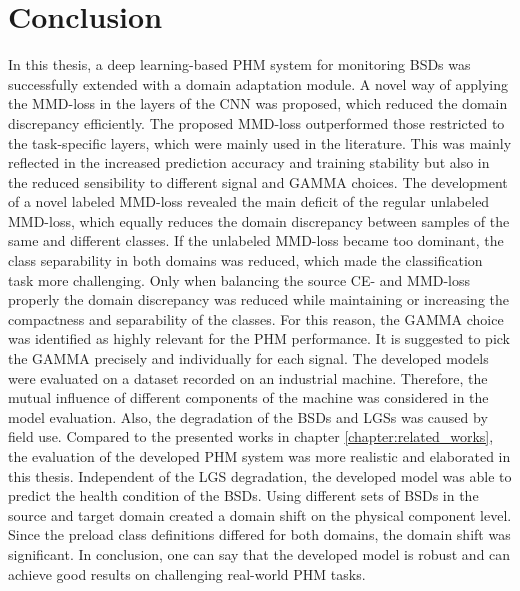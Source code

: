 \chapter{Conclusion}\label{chapter:conclusion}

In this thesis, a deep learning-based PHM system for monitoring BSDs was successfully extended with a domain adaptation module. A novel way of applying the MMD-loss in the layers of the CNN was proposed, which reduced the domain discrepancy efficiently. The proposed MMD-loss outperformed those restricted to the task-specific layers, which were mainly used in the literature. This was mainly reflected in the increased prediction accuracy and training stability but also in the reduced sensibility to different signal and GAMMA choices. The development of a novel labeled MMD-loss revealed the main deficit of the regular unlabeled MMD-loss, which equally reduces the domain discrepancy between samples of the same and different classes. If the unlabeled MMD-loss became too dominant, the class separability in both domains was reduced, which made the classification task more challenging. Only when balancing the source CE- and MMD-loss properly the domain discrepancy was reduced while maintaining or increasing the compactness and separability of the classes. For this reason, the GAMMA choice was identified as highly relevant for the PHM performance. It is suggested to pick the GAMMA precisely and individually for each signal. The developed models were evaluated on a dataset recorded on an industrial machine. Therefore, the mutual influence of different components of the machine was considered in the model evaluation. Also, the degradation of the BSDs and LGSs was caused by field use. Compared to the presented works in chapter \ref{chapter:related_works}, the evaluation of the developed PHM system was more realistic and elaborated in this thesis. Independent of the LGS degradation, the developed model was able to predict the health condition of the BSDs. Using different sets of BSDs in the source and target domain created a domain shift on the physical component level. Since the preload class definitions differed for both domains, the domain shift was significant. In conclusion, one can say that the developed model is robust and can achieve good results on challenging real-world PHM tasks.